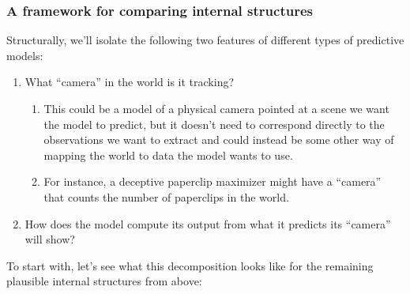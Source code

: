 \documentclass[
  onecolumn,
  natbib,
]{miri-tech-article}
\begin{document}
\subsubsection{A framework for comparing internal structures}

Structurally, we'll isolate the following two features of different types of predictive models:



\begin{enumerate}
\item What ``camera'' in the world is it tracking?
    \begin{enumerate}
    \item This could be a model of a physical camera pointed at a scene we want the model to predict, but it doesn't need to correspond directly to the observations we want to extract and could instead be some other way of mapping the world to data the model wants to use.
    \item For instance, a deceptive paperclip maximizer might have a ``camera'' that counts the number of paperclips in the world.
    \end{enumerate}
\item How does the model compute its output from what it predicts its ``camera'' will show?
\end{enumerate}

To start with, let's see what this decomposition looks like for the remaining plausible internal structures from above:
\end{document}
